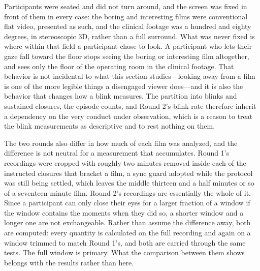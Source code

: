 Participants were seated and did not turn around, and the screen was fixed in front of them in
every case: the boring and interesting films were conventional flat video, presented as such,
and the clinical footage was a hundred and eighty degrees, in stereoscopic 3D, rather than a
full surround. What was
never fixed is where within that field a participant chose to look. A participant who lets their
gaze fall toward the floor stops seeing the boring or interesting film altogether, and sees only
the floor of the operating room in the clinical footage. That behavior is not incidental to what
this section studies---looking away from a film is one of the more legible things a disengaged
viewer does---and it is also the behavior that changes how a blink measures. The partition into
blinks and sustained closures, the episode counts, and Round 2's blink rate therefore inherit a
dependency on the very conduct under observation, which is a reason to treat the blink
measurements as descriptive and to rest nothing on them.

The two rounds also differ in how much of each film was analyzed, and the difference is not
neutral for a measurement that accumulates. Round 1's recordings were cropped with roughly two
minutes removed inside each of the instructed closures that bracket a film, a sync guard
adopted while the protocol was still being settled, which leaves the middle thirteen and a half
minutes or so of a seventeen-minute film. Round 2's recordings are essentially the whole of it.
Since a participant can only close their eyes for a larger fraction of a window if the window
contains the moments when they did so, a shorter window and a longer one are not exchangeable.
Rather than assume the difference away, both are computed: every quantity is calculated on the
full recording and again on a window trimmed to match Round 1's, and both are carried through
the same tests. The full window is primary. What the comparison between them shows belongs with
the results rather than here.

